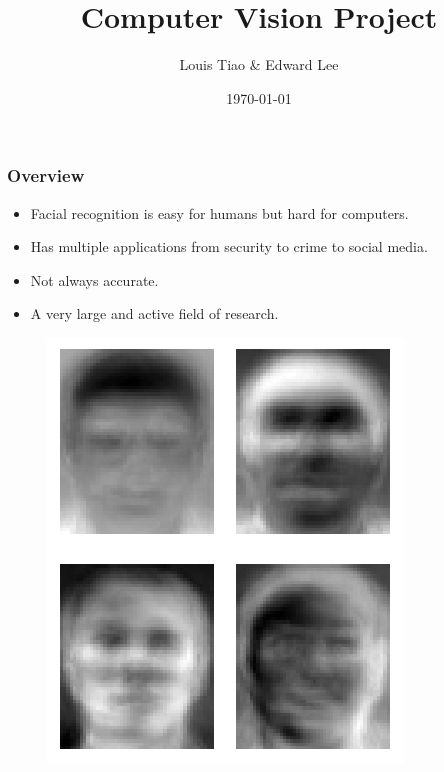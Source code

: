 \documentclass{beamer}
\title[Computer Vision]{Computer Vision Project} %
\author{Louis Tiao \& Edward Lee} %
\institute[UNSW] %
{
School of Computer Science and Engineering, \\
The University of New South Wales \\ %
\medskip
}
\date{\today} %
\begin{document}
\maketitle

\begin{frame}[t]\frametitle{Overview}
\begin{itemize}
    \item Facial recognition is easy for humans but hard for computers.
    \item Has multiple applications from security to crime to social media.
    \item Not always accurate.
    \item A very large and active field of research.
\end{itemize}
    
\begin{minipage}[t]{0.45\linewidth}
    \begin{figure}
    \includegraphics[width=0.88\linewidth]{Eigenfaces.png}
    \end{figure}
\end{minipage}
\hfill%
\begin{minipage}[t]{0.45\linewidth}
        \begin{figure}

\end{figure}
\end{minipage}
\end{frame}
\end{document}
